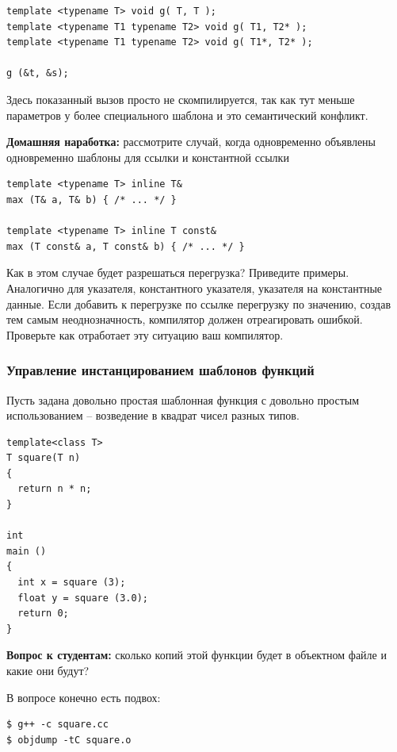 \documentclass[a4paper,12pt,oneside]{article}
\newif\ifanswers
\begin{document}
\begin{lstlisting}
template <typename T> void g( T, T ); 
template <typename T1 typename T2> void g( T1, T2* ); 
template <typename T1 typename T2> void g( T1*, T2* );

g (&t, &s);
\end{lstlisting}

Здесь показанный вызов просто не скомпилируется, так как тут меньше параметров у более специального шаблона и это семантический конфликт.

\textbf{Домашняя наработка:} рассмотрите случай, когда одновременно объявлены одновременно шаблоны для ссылки и константной ссылки

\begin{lstlisting}
template <typename T> inline T& 
max (T& a, T& b) { /* ... */ }

template <typename T> inline T const& 
max (T const& a, T const& b) { /* ... */ }
\end{lstlisting}

Как в этом случае будет разрешаться перегрузка? Приведите примеры. Аналогично для указателя, константного указателя, указателя на константные данные. Если добавить к перегрузке по ссылке перегрузку по значению, создав тем самым неоднозначность, компилятор должен отреагировать ошибкой. Проверьте как отработает эту ситуацию ваш компилятор.

\subsubsection{Управление инстанцированием шаблонов функций}\label{InstancingFuncs}

Пусть задана довольно простая шаблонная функция с довольно простым использованием -- возведение в квадрат чисел разных типов.

\begin{lstlisting}
template<class T>
T square(T n)
{
  return n * n;
}

int
main ()
{
  int x = square (3);
  float y = square (3.0);
  return 0;
}
\end{lstlisting}

\textbf{Вопрос к студентам:} сколько копий этой функции будет в объектном файле и какие они будут?

\ifanswers
В вопросе конечно есть подвох:

\begin{verbatim}
$ g++ -c square.cc
$ objdump -tC square.o
\end{verbatim}
\end{document}

